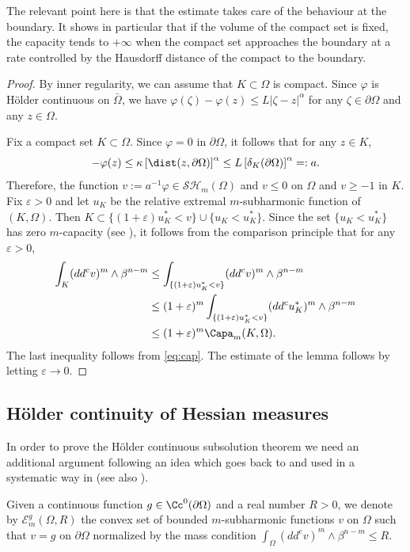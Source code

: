 The relevant point here is that the estimate takes care of the behaviour at the boundary. It shows in particular that if the volume of the compact set is fixed, the capacity tends to $+ \infty$ when the compact set approaches the boundary at a rate controlled by the Hausdorff distance of the compact to the boundary.
\begin{proof}
By inner regularity, we can assume that $K \subset \Omega$ is compact.
Since $\varphi$ is Hölder continuous on $\bar \Omega$, we have
$\varphi (\zeta) - \varphi (z) \leq L \vert \zeta - z\vert^{\alpha}$ for any $\zeta \in \partial \Omega$ and any $z \in \Omega$.

Fix a compact set $K \subset \Omega$. Since $\varphi = 0$ in $\partial \Omega$, it follows that for any $z \in K$,
\[
- \varphi (z) \leq \kappa \left[\dist (z,\partial \Omega)\right]^{\alpha} \leq L \left[\delta_K (\partial \Omega)\right]^{\alpha} =:a.
\]
Therefore, the function $v:= a^{-1} \varphi \in \mathcal{SH}_m (\Omega)$ and $ v \leq 0$ on $\Omega$ and $v \geq - 1$ in $K$. Fix $\varepsilon >0$ and let $u_K$ be the relative extremal $m$-subharmonic function of $(K,\Omega)$. Then $ K \subset \{ (1 + \varepsilon) u_K^* < v\} \cup \{u_K < u_K^*\}$. Since the set $\{u_K < u_K^*\}$ has zero $m$-capacity (see \cite{Lu12}), it follows from the comparison principle that for any $\varepsilon > 0$,
\begin{align*}
\int_K (dd^c v)^m \wedge \beta^{n - m} &\leq \int_{\{ (1 + \varepsilon) u_K^* < v\}} (dd^c v)^m \wedge \beta^{n - m} \\
&\leq (1+ \varepsilon)^m \int_{\{ (1 + \varepsilon) u_K^* < v\}} (dd^c u_K^*)^m \wedge \beta^{n - m} \\
& \leq (1+ \varepsilon)^m \Capa_m (K,\Omega).
\end{align*}
The last inequality follows from \eqref{eq:cap}.
The estimate of the lemma follows by letting $\varepsilon \to 0$.
\end{proof}

\subsection{Hölder continuity of Hessian measures}

In order to prove the Hölder continuous subsolution theorem we need an additional argument following an idea which goes back to \cite{DDGKPZ15} and used in a systematic way in \cite{N18a} (see also \cite{KN19}).

Given a continuous function $g \in \Cc^0 (\partial \Omega)$ and a real number $R > 0$, we denote by $\mathcal{E}^g_m(\Omega,R)$ the convex set of bounded $m$-subharmonic functions $v $ on $\Omega$ such that $v = g$ on $\partial \Omega$ normalized by the mass condition $\int_{\Omega} (dd^c v)^m \wedge \beta^{n -m} \leq R$.

